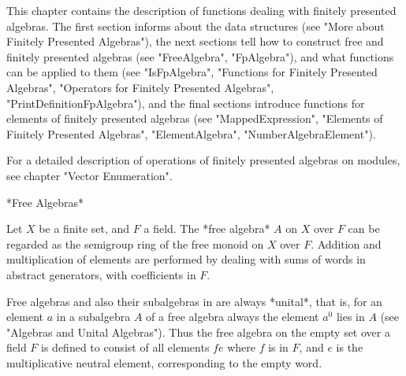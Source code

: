\def\MeatAxe{\sf MeatAxe}
\def\VE{\mbox{\rm Vector Enumeration}}

This chapter contains the description of functions dealing with finitely
presented algebras.
The first section informs about the data structures
(see "More about Finitely Presented Algebras"),
the next sections tell how to construct free and finitely presented algebras
(see "FreeAlgebra", "FpAlgebra"), and what functions can be applied to them
(see "IsFpAlgebra", "Functions for Finitely Presented Algebras", "Operators
for Finitely Presented Algebras", "PrintDefinitionFpAlgebra"),
and the final sections introduce functions for elements of finitely
presented algebras (see "MappedExpression", "Elements of Finitely Presented
Algebras", "ElementAlgebra", "NumberAlgebraElement").

For a detailed description of operations of finitely presented algebras on
modules, see chapter "Vector Enumeration".


*Free Algebras*

Let $X$ be a finite set, and $F$ a field.
The *free algebra* $A$ on $X$ over $F$ can be regarded as the semigroup ring
of the free monoid on $X$ over $F$.
Addition and multiplication of elements are performed by dealing with
sums of words in abstract generators, with coefficients in $F$.

Free algebras and also their subalgebras in {\GAP} are always *unital*,
that is, for an element $a$ in a subalgebra $A$ of a free algebra always
the element $a^0$ lies in $A$ (see "Algebras and Unital Algebras").
Thus the free algebra on the empty set over a field $F$ is
defined to consist of all elements $f e$ where $f$ is in $F$, and $e$ is
the multiplicative neutral element, corresponding to the empty word.

